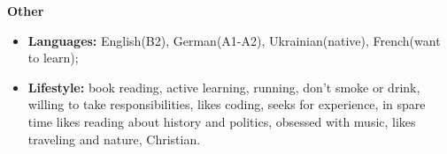 {
    {\vspace{0.5cm} \hspace{-0.5cm} \Large \textbf{Other}}

    \begin{itemize}
        \item \textbf{Languages:} English(B2), German(A1-A2), Ukrainian(native), French(want to learn);
        \item \textbf{Lifestyle:}
            book reading,
            active learning,
            running,
            don't smoke or drink,
            willing to take responsibilities,
            likes coding,
            seeks for experience,
            in spare time likes reading about history and politics,
            obsessed with music,
            likes traveling and nature,
            Christian.
            
    \end{itemize}
}
